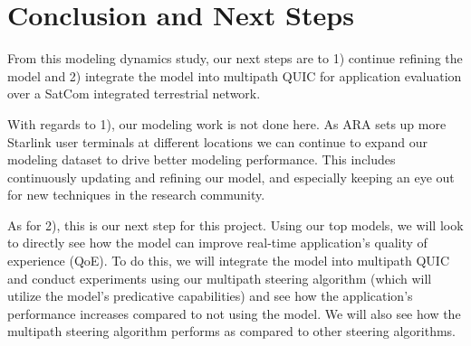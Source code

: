 \documentclass[12pt]{article}
\begin{document}
\section{Conclusion and Next Steps}\label{sec: conclusion}

From this modeling dynamics study, our next steps are to 1) continue refining the model and 2) integrate the model into multipath QUIC for application evaluation over a SatCom integrated terrestrial network. 

With regards to 1), our modeling work is not done here. As ARA sets up more Starlink user terminals at different locations we can continue to expand our modeling dataset to drive better modeling performance. This includes continuously updating and refining our model, and especially keeping an eye out for new techniques in the research community.

As for 2), this is our next step for this project. Using our top models, we will look to directly see how the model can improve real-time application's quality of experience (QoE). To do this, we will integrate the model into multipath QUIC and conduct experiments using our multipath steering algorithm (which will utilize the model's predicative capabilities) and see how the application's performance increases compared to not using the model. We will also see how the multipath steering algorithm performs as compared to other steering algorithms. 



\end{document}
